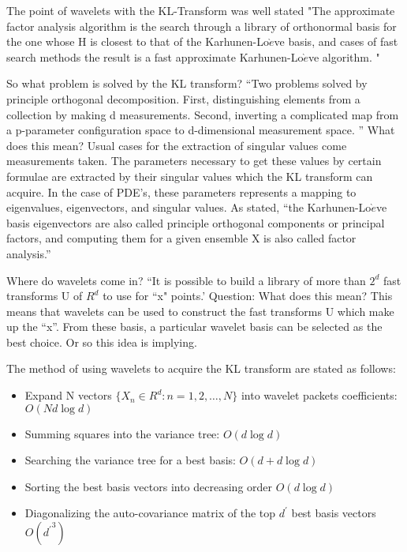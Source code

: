 \documentclass[11pt]{article}
\begin{document}
The point of wavelets with the KL-Transform was well stated "The approximate factor analysis algorithm is the search through a library of orthonormal basis for the one whose H is closest to that of the Karhunen-Lo$\grave{e}$ve basis, and cases of fast search methods the result is a fast approximate Karhunen-Lo$\grave{e}$ve algorithm.  "\cite{victor}  

So what problem is solved by the KL transform?   ``Two problems solved by  principle orthogonal decomposition.  First, distinguishing elements from a collection by making d measurements.  Second, inverting a complicated map from a p-parameter configuration space to d-dimensional measurement space. '' \cite{victor}  What does this mean?  Usual cases for the extraction of singular values come measurements taken.  The parameters necessary to get these values by certain formulae are extracted by their singular values which the KL transform can acquire.  In the case of PDE's, these parameters represents a mapping to eigenvalues, eigenvectors, and singular values.  As stated, ``the Karhunen-Lo$\grave{e}$ve basis eigenvectors are also called principle orthogonal components or principal factors, and computing them for a given ensemble X is also called factor analysis.''\cite{victor}

Where do wavelets come in?   ``It is possible to build a library of more than $2^d$ fast transforms U of $R^d$ to use for ``x" points.'
Question:  What does this mean?  
 This means that wavelets can be used to construct the fast transforms U which make up the ``x''.  From these basis, a particular wavelet basis can be selected as the best choice.  Or so this idea is implying.


The method of using wavelets to acquire the KL transform are stated as follows:  
 \begin{itemize}
\item Expand N vectors $\{X_n \in R^d : n = 1,2, \ldots ,N\}$ into wavelet packets coefficients: $O(Nd\log d)$
 \item Summing squares into the variance tree: $O(d \log d)$
 \item Searching the variance tree for a best basis: $O(d+d\log d)$
 \item Sorting the best basis vectors into decreasing order $O(d \log d)$
 \item Diagonalizing the auto-covariance matrix of the top $d^\prime$ best basis vectors $O({d^\prime}^3)$
\end{itemize}
\end{document}

